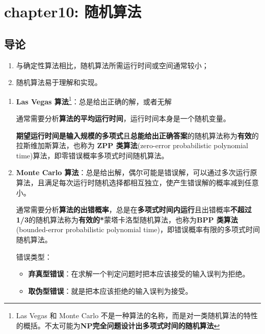 \documentclass[./../main.tex]{subfiles} %
\begin{document}
\section{chapter10: 随机算法}
\subsection{导论}


\begin{enumerate}
    \item 与确定性算法相比，随机算法所需运行时间或空间通常较小；
    \item 随机算法易于理解和实现。
\end{enumerate}

\begin{enumerate}
    \item \textbf{Las Vegas 算法}\footnote{Las Vegas 和 Monte Carlo 不是一种算法的名称，而是对一类随机算法的特性的概括。不太可能为\textbf{NP完全问题设计出多项式时间的随机算法}}：总是给出正确的解，或者无解

    通常需要分析\textbf{算法的平均运行时间}，运行时间本身是一个随机变量。

   \textbf{期望运行时间是输入规模的多项式}且\textbf{总能给出正确答案}的随机算法称为\textbf{有效}的拉斯维加斯算法，也称为 \textbf{ZPP 类算法}(zero-error probabilistic polynomial time)算法，即零错误概率多项式时间随机算法。
   
    \item \textbf{Monte Carlo 算法}：总是给出解，偶尔可能是错误解，可以通过多次运行原算法，且满足每次运行时随机选择都相互独立，使产生错误解的概率减到任意小。

    通常需要分析\textbf{算法的出错概率}，总是在\textbf{多项式时间内运行}且出错概率\textbf{不超过 1/3}的随机算法称为\textbf{有效的*}蒙塔卡洛型随机算法，也称为\textbf{BPP 类算法}(bounded-error probabilistic polynomial time)，即错误概率有限的多项式时间随机算法。

    错误类型：
    \begin{itemize}
        \item \textbf{弃真型错误}：在求解一个判定问题时把本应该接受的输入误判为拒绝。
        \item \textbf{取伪型错误}：就是把本应该拒绝的输入误判为接受。
    \end{itemize}


\end{enumerate}
\end{document}
